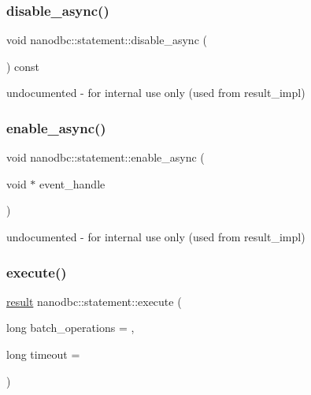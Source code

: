 \subsubsection{\texorpdfstring{disable\_async()}{disable\_async()}}
{\footnotesize\ttfamily void nanodbc\+::statement\+::disable\+\_\+async (\begin{DoxyParamCaption}{ }\end{DoxyParamCaption}) const}



undocumented -\/ for internal use only (used from result\+\_\+impl) 

\mbox{\label{classnanodbc_1_1statement_ada8ceb1d90ebe7c0a876a185fa89f009}} 
\subsubsection{\texorpdfstring{enable\_async()}{enable\_async()}}
{\footnotesize\ttfamily void nanodbc\+::statement\+::enable\+\_\+async (\begin{DoxyParamCaption}\item[{void $\ast$}]{event\+\_\+handle }\end{DoxyParamCaption})}



undocumented -\/ for internal use only (used from result\+\_\+impl) 

\mbox{\label{classnanodbc_1_1statement_ab30dac3e4defd5a90181202e99ee8ca5}} 
\subsubsection{\texorpdfstring{execute()}{execute()}}
{\footnotesize\ttfamily \mbox{\hyperlink{classnanodbc_1_1result}{result}} nanodbc\+::statement\+::execute (\begin{DoxyParamCaption}\item[{long}]{batch\+\_\+operations = {},  }\item[{long}]{timeout = {} }\end{DoxyParamCaption})}



